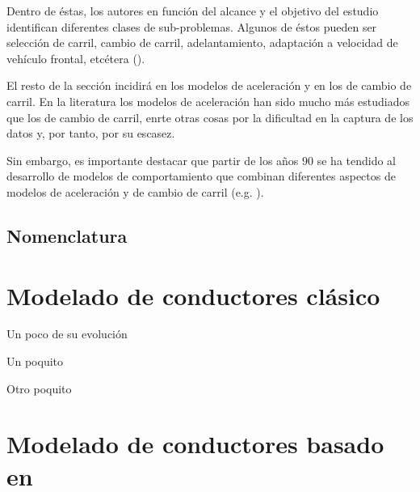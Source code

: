 Dentro de éstas, los autores en función del alcance y el objetivo del estudio identifican diferentes clases de sub-problemas. Algunos de éstos pueden ser selección de carril, cambio de carril, adelantamiento, adaptación a velocidad de vehículo frontal, etcétera (\cite{Aycin1999}).

El resto de la sección incidirá en los modelos de aceleración y en los de cambio de carril. En la literatura los modelos de aceleración han sido mucho más estudiados que los de cambio de carril, enrte otras cosas por la dificultad en la captura de los datos y, por tanto, por su escasez.

Sin embargo, es importante destacar que partir de los años $90$ se ha tendido al desarrollo de modelos de comportamiento que combinan diferentes aspectos de modelos de aceleración y de cambio de carril (e.g. \cite{Ma2004}).

\subsection{Nomenclatura}


\section{Modelado de conductores clásico}


Un poco de su evolución


Un poquito


Otro poquito


\section{Modelado de conductores basado en }

